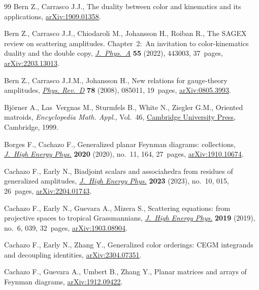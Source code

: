 \documentclass[pdftex]{sigma}
\theoremstyle{definition}
\numberwithin{equation}{section}
\begin{document}
\begin{thebibliography}{99}
Bern Z., Carrasco J.J., The duality between color and kinematics and its
 applications, \href{https://arxiv.org/abs/1909.01358}{arXiv:1909.01358}.

Bern Z., Carrasco J.J., Chiodaroli M., Johansson H., Roiban R., The {SAGEX}
 review on scattering amplitudes. {C}hapter~{2}:~{A}n invitation to
 color-kinematics duality and the double copy, \href{https://doi.org/10.1088/1751-8121/ac93cf}{\textit{J.~Phys.~A}} \textbf{55}
 (2022), 443003, 37~pages, \href{https://arxiv.org/abs/2203.13013}{arXiv:2203.13013}.

Bern Z., Carrasco J.J.M., Johansson H., New relations for gauge-theory
 amplitudes, \href{https://doi.org/10.1103/PhysRevD.78.085011}{\textit{Phys. Rev.~D}} \textbf{78} (2008), 085011, 19~pages,
 \href{https://arxiv.org/abs/0805.3993}{arXiv:0805.3993}.

Bj\"orner A., Las~Vergnas M., Sturmfels B., White N., Ziegler G.M., Oriented
 matroids, \textit{Encyclopedia Math. Appl.}, Vol.~46, \href{https://doi.org/10.1017/CBO9780511586507}{Cambridge University
 Press}, Cambridge, 1999.

Borges F., Cachazo F., Generalized planar {F}eynman diagrams: collections,
 \href{https://doi.org/10.1007/jhep11(2020)164}{\textit{J.~High Energy Phys.}} \textbf{2020} (2020), no.~11, 164, 27~pages,
 \href{https://arxiv.org/abs/1910.10674}{arXiv:1910.10674}.

Cachazo F., Early N., Biadjoint scalars and associahedra from residues of
 generalized amplitudes, \href{https://doi.org/10.1007/jhep10(2023)015}{\textit{J.~High Energy Phys.}} \textbf{2023} (2023),
 no.~10, 015, 26~pages, \href{https://arxiv.org/abs/2204.01743}{arXiv:2204.01743}.

Cachazo F., Early N., Guevara A., Mizera S., Scattering equations: from
 projective spaces to tropical {G}rassmannians, \href{https://doi.org/10.1007/jhep06(2019)039}{\textit{J.~High Energy Phys.}}
 \textbf{2019} (2019), no.~6, 039, 32~pages, \href{https://arxiv.org/abs/1903.08904}{arXiv:1903.08904}.

Cachazo F., Early N., Zhang Y., Generalized color orderings: {CEGM} integrands
 and decoupling identities, \href{https://arxiv.org/abs/2304.07351}{arXiv:2304.07351}.

Cachazo F., Guevara A., Umbert B., Zhang Y., Planar matrices and arrays of
 {F}eynman diagrams, \href{https://arxiv.org/abs/1912.09422}{arXiv:1912.09422}.


\end{thebibliography}
\end{document}
